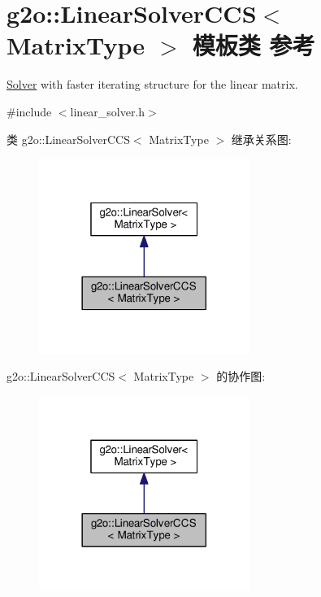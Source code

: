 \hypertarget{classg2o_1_1LinearSolverCCS}{\section{g2o\-:\-:Linear\-Solver\-C\-C\-S$<$ Matrix\-Type $>$ 模板类 参考}
\label{classg2o_1_1LinearSolverCCS}
}


\hyperlink{classg2o_1_1Solver}{Solver} with faster iterating structure for the linear matrix.  




{\ttfamily \#include $<$linear\-\_\-solver.\-h$>$}



类 g2o\-:\-:Linear\-Solver\-C\-C\-S$<$ Matrix\-Type $>$ 继承关系图\-:
\nopagebreak
\begin{figure}[H]
\begin{center}
\leavevmode
\includegraphics[width=194pt]{classg2o_1_1LinearSolverCCS__inherit__graph}
\end{center}
\end{figure}


g2o\-:\-:Linear\-Solver\-C\-C\-S$<$ Matrix\-Type $>$ 的协作图\-:
\nopagebreak
\begin{figure}[H]
\begin{center}
\leavevmode
\includegraphics[width=194pt]{classg2o_1_1LinearSolverCCS__coll__graph}
\end{center}
\end{figure}
